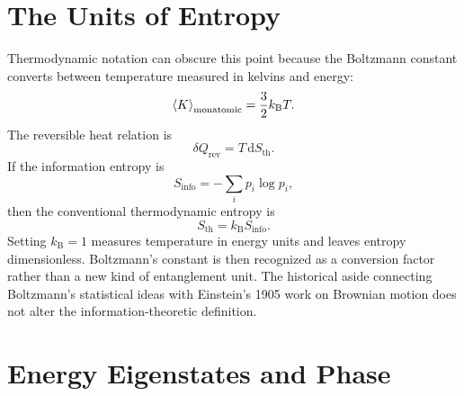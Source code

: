 \section{The Units of Entropy}

\begin{classroomqa}
\end{classroomqa}

Thermodynamic notation can obscure this point because the Boltzmann constant converts between temperature measured in kelvins and energy:
\begin{equation}
\left\langle K\right\rangle_{\mathrm{monatomic}}
=\frac32 k_{\mathrm B}T.
\end{equation}
The reversible heat relation is
\begin{equation}
\delta Q_{\mathrm{rev}}=T\,\mathrm dS_{\mathrm{th}}.
\end{equation}
If the information entropy is
\begin{equation}
S_{\mathrm{info}}=-\sum_i p_i\log p_i,
\end{equation}
then the conventional thermodynamic entropy is
\begin{equation}
S_{\mathrm{th}}=k_{\mathrm B}S_{\mathrm{info}}.
\end{equation}
Setting \(k_{\mathrm B}=1\) measures temperature in energy units and leaves entropy dimensionless. Boltzmann's constant is then recognized as a conversion factor rather than a new kind of entanglement unit. The historical aside connecting Boltzmann's statistical ideas with Einstein's 1905 work on Brownian motion does not alter the information-theoretic definition.

\section{Energy Eigenstates and Phase}

\begin{classroomqa}
\end{classroomqa}

